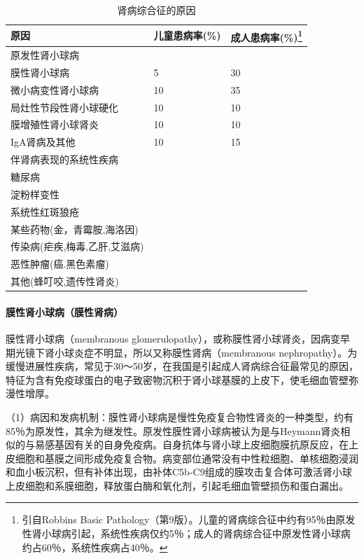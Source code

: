 \begin{longtable}[htbp]{lll}
    \caption{肾病综合征的原因}
    \label{tab10-2}\\
    \toprule
    原因 &儿童患病率(\%) &成人患病率(\%)\footnote{引自Robbins Basic
Pathology（第9版）。儿童的肾病综合征中约有95％由原发性肾小球病引起，系统性疾病仅约5％；成人的肾病综合征中原发性肾小球病约占60％，系统性疾病占40％。}\\
    \midrule
    原发性肾小球病&&\\
膜性肾小球病&5&30\\
微小病变性肾小球病&10&35\\
局灶性节段性肾小球硬化&10&10\\
膜增殖性肾小球肾炎&10&10\\
IgA肾病及其他&10&15\\
伴肾病表现的系统性疾病&&\\
糖尿病&&\\
淀粉样变性&&\\
系统性红斑狼疮&&\\
某些药物(金，青霉胺,海洛因)&&\\
传染病(疟疾,梅毒,乙肝,艾滋病)&&\\
恶性肿瘤(癌.黑色素瘤)&&\\
其他(蜂叮咬,遗传性肾炎)&&\\
    \bottomrule
\end{longtable}

\paragraph{膜性肾小球病（膜性肾病）}
膜性肾小球病（membranous
glomerulopathy），或称膜性肾小球肾炎，因病变早期光镜下肾小球炎症不明显，所以又称膜性肾病（membranous
nephropathy）。为缓慢进展性疾病，常见于30～50岁，在我国是引起成人肾病综合征最常见的原因，特征为含有免疫球蛋白的电子致密物沉积于肾小球基膜的上皮下，使毛细血管壁弥漫性增厚。

（1）病因和发病机制：膜性肾小球病是慢性免疫复合物性肾炎的一种类型，约有85％为原发性，其余为继发性。原发性膜性肾小球病被认为是与Heymann肾炎相似的与易感基因有关的自身免疫病。自身抗体与肾小球上皮细胞膜抗原反应，在上皮细胞和基膜之间形成免疫复合物。病变部位通常没有中性粒细胞、单核细胞浸润和血小板沉积，但有补体出现，由补体C5b-C9组成的膜攻击复合体可激活肾小球上皮细胞和系膜细胞，释放蛋白酶和氧化剂，引起毛细血管壁损伤和蛋白漏出。

